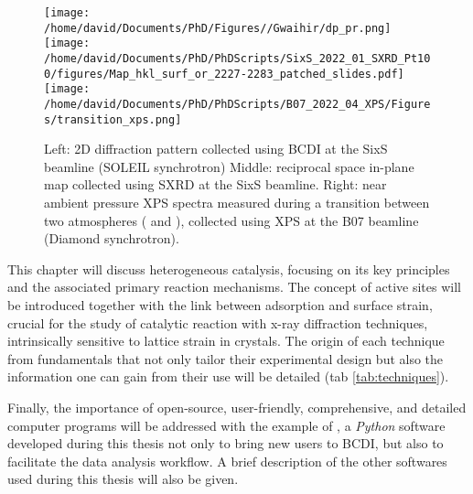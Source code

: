 \begin{figure}[!htb]
    \centering
    \texttt{[image: /home/david/Documents/PhD/Figures//Gwaihir/dp\_pr.png]}
    \texttt{[image: /home/david/Documents/PhD/PhDScripts/SixS\_2022\_01\_SXRD\_Pt100/figures/Map\_hkl\_surf\_or\_2227-2283\_patched\_slides.pdf]}
    \texttt{[image: /home/david/Documents/PhD/PhDScripts/B07\_2022\_04\_XPS/Figures/transition\_xps.png]}
    \caption{
    Left: 2D diffraction pattern collected using BCDI at the SixS beamline (SOLEIL synchrotron)
    Middle: reciprocal space in-plane map collected using SXRD at the SixS beamline.
    Right: near ambient pressure XPS spectra measured during a transition between two atmospheres (  and ), collected using XPS at the B07 beamline (Diamond synchrotron).
    }
    \label{fig:TechniquesDataExamples}
\end{figure}

This chapter will discuss heterogeneous catalysis, focusing on its key principles and the associated primary reaction mechanisms.
The concept of active sites will be introduced together with the link between adsorption and surface strain, crucial for the study of catalytic reaction with x-ray diffraction techniques, intrinsically sensitive to lattice strain in crystals.
The origin of each technique from fundamentals that not only tailor their experimental design but also the information one can gain from their use will be detailed (tab \ref{tab:techniques}).

Finally, the importance of open-source, user-friendly, comprehensive, and detailed computer programs will be addressed with the example of , a \textit{Python} software developed during this thesis not only to bring new users to BCDI, but also to facilitate the data analysis workflow.
A brief description of the other softwares used during this thesis will also be given.